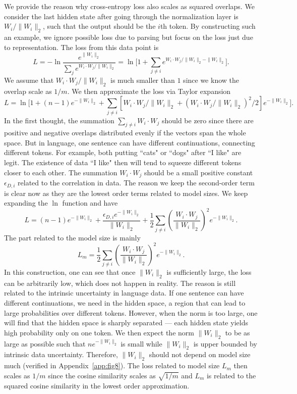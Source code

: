 \documentclass{article}
\begin{document}
We provide the reason why cross-entropy loss also scales as squared overlaps. We consider the last hidden state after going through the normalization layer is $W_i / \|W_i \|_2$, such that the output should be the $i$th token. By constructing such an example, we ignore possible loss due to parsing but focus on the loss just due to representation. The loss from this data point is 
\begin{equation}
    L = -\ln \frac{e^{\|W_i \|_2}}{\sum_j e^{W_i \cdot W_j / \|W_i\|_2}} = \ln \Big[ 1 + \sum_{j\neq i} e^{W_i \cdot W_j / \|W_i\|_2 - \|W_i \|_2} \Big].
\end{equation}
We assume that $W_i \cdot W_j / \|W_i\|_2$ is much smaller than $1$ since we know the overlap scale as $1/m$. We then approximate the loss via Taylor expansion
\begin{equation}
    L = \ln \Big[ 1 + (n-1)e^{- \|W_i \|_2} + \sum_{j\neq i}[W_i \cdot W_j / \|W_i\|_2 + (W_i \cdot W_j / \|W_i\|_2)^2 / 2] e^{- \|W_i \|_2} \Big].
\end{equation}
In the first thought, the summation $\sum_{j\neq i}W_i \cdot W_j$ should be zero since there are positive and negative overlaps distributed evenly if the vectors span the whole space. But in language, one sentence can have different continuations, connecting different tokens. For example, both putting ``cats" or ``dogs" after ``I like" are legit. The existence of data ``I like" then will tend to squeeze different tokens closer to each other. The summation $W_i \cdot W_j$ should be a small positive constant $\epsilon_{D,i}$ related to the correlation in data. The reason we keep the second-order term is clear now as they are the lowest order terms related to model sizes. We keep expanding the $\ln$ function and have
\begin{equation}
    L = (n-1)e^{- \|W_i \|_2} + \frac{\epsilon_{D,i}e^{- \|W_i \|_2}}{\|W_i\|_2}+ \frac{1}{2}\sum_{j\neq i}\left(\frac{W_i \cdot W_j}{ \|W_i\|_2}\right)^2e^{- \|W_i \|_2}.
\end{equation}
The part related to the model size is mainly
\begin{equation}
    L_m = \frac{1}{2}\sum_{j\neq i}\left(\frac{W_i \cdot W_j}{ \|W_i\|_2}\right)^2e^{- \|W_i \|_2}.
\end{equation}
In this construction, one can see that once $\|W_i \|_2$ is sufficiently large, the loss can be arbitrarily low, which does not happen in reality. The reason is still related to the intrinsic uncertainty in language data. If one sentence can have different continuations, we need in the hidden space, a region that can lead to large probabilities over different tokens. However, when the norm is too large, one will find that the hidden space is sharply separated --- each hidden state yields high probability only on one token. We then expect the norm $\| W_i \|_2$ to be as large as possible such that $n e^{-\| W_i \|_2}$ is small while $\| W_i \|_2$ is upper bounded by intrinsic data uncertainty. Therefore, $\| W_i \|_2$ should not depend on model size much (verified in Appendix~\ref{app:fig8}). The loss related to model size $L_m$ then scales as $1/m$ since the cosine similarity scales as $\sqrt{1/m}$ and $L_m$ is related to the squared cosine similarity in the lowest order approximation.
\end{document}
